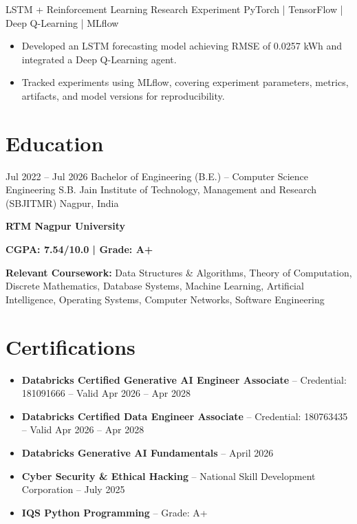 \documentclass[11pt,a4paper,sans]{moderncv}
\begin{document}
\cventry
{}
{LSTM + Reinforcement Learning Research Experiment}
{PyTorch | TensorFlow | Deep Q-Learning | MLflow}
{}
{}
{
\begin{itemize}

\item
Developed an LSTM forecasting model achieving RMSE of 0.0257 kWh
and integrated a Deep Q-Learning agent.

\item
Tracked experiments using MLflow, covering experiment parameters,
metrics, artifacts, and model versions for reproducibility.

\end{itemize}
}


\section{Education}

\cventry
{Jul 2022 -- Jul 2026}
{Bachelor of Engineering (B.E.) -- Computer Science Engineering}
{S.B. Jain Institute of Technology, Management and Research (SBJITMR)}
{Nagpur, India}
{}
{
\textbf{RTM Nagpur University}

\textbf{CGPA: 7.54/10.0 \quad | \quad Grade: A+}

\textbf{Relevant Coursework:}
Data Structures \& Algorithms, Theory of Computation,
Discrete Mathematics, Database Systems, Machine Learning,
Artificial Intelligence, Operating Systems, Computer Networks,
Software Engineering
}


\section{Certifications}

\begin{itemize}

\item
\textbf{Databricks Certified Generative AI Engineer Associate}
-- Credential: 181091666 -- Valid Apr 2026 -- Apr 2028

\item
\textbf{Databricks Certified Data Engineer Associate}
-- Credential: 180763435 -- Valid Apr 2026 -- Apr 2028

\item
\textbf{Databricks Generative AI Fundamentals}
-- April 2026

\item
\textbf{Cyber Security \& Ethical Hacking}
-- National Skill Development Corporation -- July 2025

\item
\textbf{IQS Python Programming}
-- Grade: A+

\end{itemize}
\end{document}
